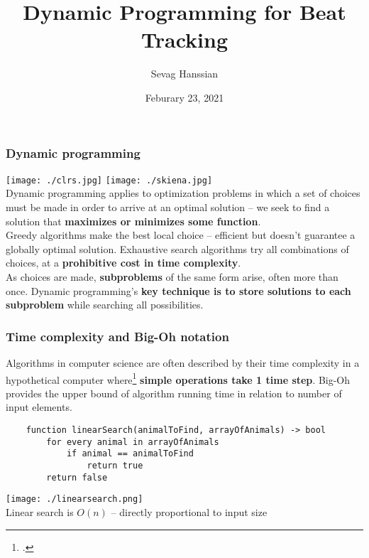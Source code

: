 \documentclass{beamer}
\title{Dynamic Programming for Beat Tracking}
\author{Sevag Hanssian}
\date{Feburary 23, 2021}
\institute{MUMT 621, Winter 2021}
\begin{document}
\begin{frame}
\maketitle
\end{frame}

\begin{frame}
	\frametitle{Dynamic programming}
	\vspace{0.5em}
	\texttt{[image: ./clrs.jpg]} \texttt{[image: ./skiena.jpg]}\\
	Dynamic programming applies to optimization problems in which a set of choices must be made in order to arrive at an optimal solution -- we seek to find a solution that \textbf{maximizes or minimizes some function}.\\
	\vspace{1em}
	Greedy algorithms make the best local choice -- efficient but doesn't guarantee a globally optimal solution. Exhaustive search algorithms try all combinations of choices, at a \textbf{prohibitive cost in time complexity}.\\
	\vspace{1em}
	As choices are made, \textbf{subproblems} of the same form arise, often more than once. Dynamic programming's \textbf{key technique is to store solutions to each subproblem} while searching all possibilities.
\end{frame}

\begin{frame}[fragile]
	\frametitle{Time complexity and Big-Oh notation}
	Algorithms in computer science are often described by their time complexity in a hypothetical computer where\footcite{skiena} \textbf{simple operations take 1 time step}. Big-Oh provides the upper bound of algorithm running time in relation to number of input elements.
	\begin{verbatim}
	function linearSearch(animalToFind, arrayOfAnimals) -> bool
	    for every animal in arrayOfAnimals
	        if animal == animalToFind
	            return true
	    return false
	\end{verbatim}
	\texttt{[image: ./linearsearch.png]}\\
	Linear search is $O(n)$ -- directly proportional to input size
\end{frame}

\end{document}
